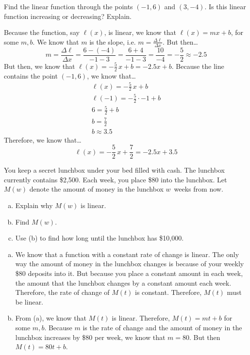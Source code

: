 \documentclass[12pt,letterpaper]{exam}
\begin{document}
\begin{questions}
\newpage
\question[10] Find the linear function through the points $(-1, 6)$ and $(3, -4)$. Is this linear function increasing or decreasing? Explain. \pspace

\sol Because the function, say $\ell(x)$, is linear, we know that $\ell(x)= mx + b$, for some $m, b$. We know that $m$ is the slope, i.e. $m= \frac{\Delta \ell}{\Delta x}$. But then\dots
	\[
	m= \frac{\Delta \ell}{\Delta x}= \dfrac{6 - (-4)}{-1 - 3}= \dfrac{6 + 4}{-1 - 3}= \dfrac{10}{-4}= -\dfrac{5}{2} \approx -2.5
	\] \pspace
But then, we know that $\ell(x)= -\frac{5}{2}\,x + b= -2.5x + b$. Because the line contains the point $(-1, 6)$, we know that\dots
	\[
	\begin{gathered}
	\ell(x)= -\frac{5}{2}\,x + b \\
	\ell(-1)= -\frac{5}{2} \cdot -1 + b \\
	6= \frac{5}{2} + b \\
	b= \frac{7}{2} \\
	b \approx 3.5
	\end{gathered}
	\] \pspace
Therefore, we know that\dots
	\[
	\ell(x)= -\frac{5}{2}\,x + \frac{7}{2}= -2.5x + 3.5
	\]



\newpage
\question[10] You keep a secret lunchbox under your bed filled with cash. The lunchbox currently contains \$2,500. Each week, you place \$80 into the lunchbox. Let $M(w)$ denote the amount of money in the lunchbox $w$~weeks from now. 
	\begin{enumerate}[(a)]
	\item Explain why $M(w)$ is linear.
	\item Find $M(w)$. 
	\item Use (b) to find how long until the lunchbox has \$10,000. 
	\end{enumerate} \pspace

\sol 
\begin{enumerate}[(a)]
\item We know that a function with a constant rate of change is linear. The only way the amount of money in the lunchbox changes is because of your weekly \$80 deposits into it. But because you place a constant amount in each week, the amount that the lunchbox changes by a constant amount each week. Therefore, the rate of change of $M(t)$ is constant. Therefore, $M(t)$ must be linear. \pspace

\item From (a), we know that $M(t)$ is linear. Therefore, $M(t)= mt + b$ for some $m, b$. Because $m$ is the rate of change and the amount of money in the lunchbox increases by \$80 per week, we know that $m= 80$. But then $M(t)= 80t + b$. \pspace


\end{enumerate}
\end{questions}
\end{document}
